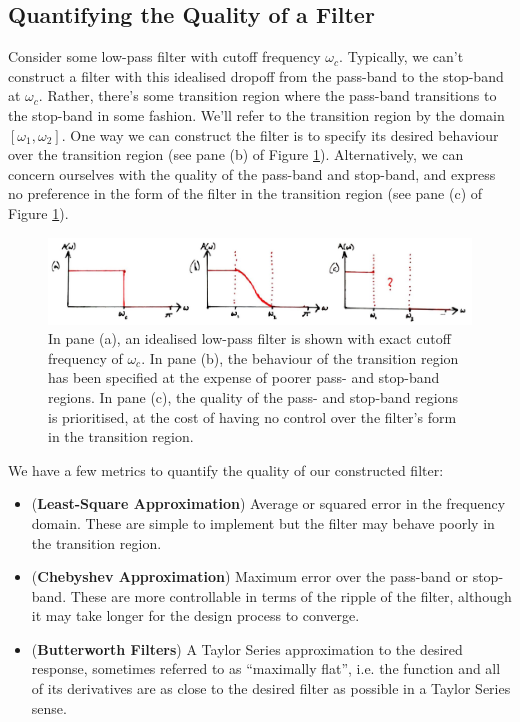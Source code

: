 \subsection{Quantifying the Quality of a Filter}
%
Consider some low-pass filter with cutoff frequency $\omega_c$. Typically,
we can't construct a filter with this idealised dropoff from the pass-band
to the stop-band at $\omega_c$. Rather, there's some transition region where
the pass-band transitions to the stop-band in some fashion. We'll refer to
the transition region by the domain $[\omega_1,\omega_2]$. One way we can
construct the filter is to specify its desired behaviour over the transition
region (see pane (b) of Figure \ref{fig::lecture_16_filter_quality}).
Alternatively, we can concern ourselves with the
quality of the pass-band and stop-band, and express no preference in the
form of the filter in the transition region (see pane (c) of
Figure \ref{fig::lecture_16_filter_quality}).\\
%
\begin{figure}[H]
  \includegraphics[width=\textwidth]{images/lecture_16_filter_quality.JPG}
  \caption{In pane (a), an idealised low-pass filter is shown with
    exact cutoff frequency of $\omega_c$. In pane (b), the behaviour of
    the transition region has been specified at the expense of poorer
    pass- and stop-band regions. In pane (c), the quality of the
    pass- and stop-band regions is prioritised, at the cost of
    having no control over the filter's form in the transition region.
  }
  \label{fig::lecture_16_filter_quality}
\end{figure}
%
We have a few metrics to quantify the quality of our constructed filter:
%
\begin{itemize}
\item (\textbf{Least-Square Approximation}) Average or squared error in the
  frequency domain. These are simple to implement but the filter may behave
  poorly in the transition region.
\item (\textbf{Chebyshev Approximation}) Maximum error over the pass-band or
  stop-band. These are more controllable in terms of the ripple of the filter,
  although it may take longer for the design process to converge.
\item (\textbf{Butterworth Filters}) A Taylor Series approximation to the
  desired response, sometimes referred to as ``maximally flat'', i.e. the function
  and all of its derivatives are as close to the desired filter as possible
  in a Taylor Series sense.
\end{itemize}


